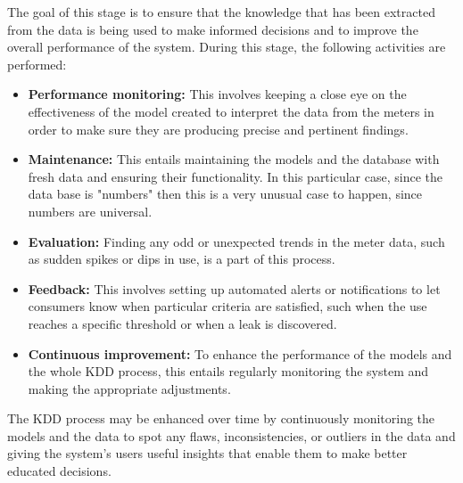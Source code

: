 The goal of this stage is to ensure that the knowledge that has been extracted from the data is being used to make informed decisions and to improve the overall performance of the system. During this stage, the following activities are performed:

\begin{itemize}
	\item \textbf{Performance monitoring:} This involves keeping a close eye on the effectiveness of the model created to interpret the data from the meters in order to make sure they are producing precise and pertinent findings.
	\item \textbf{Maintenance:} This entails maintaining the models and the database with fresh data and ensuring their functionality. In this particular case, since the data base is "numbers" then this is a very unusual case to happen, since numbers are universal.
	\item \textbf{Evaluation:} Finding any odd or unexpected trends in the meter data, such as sudden spikes or dips in use, is a part of this process.
	\item \textbf{Feedback:} This involves setting up automated alerts or notifications to let consumers know when particular criteria are satisfied, such when the use reaches a specific threshold or when a leak is discovered.
	\item \textbf{Continuous improvement:} To enhance the performance of the models and the whole KDD process, this entails regularly monitoring the system and making the appropriate adjustments.
\end{itemize}

The KDD process may be enhanced over time by continuously monitoring the models and the data to spot any flaws, inconsistencies, or outliers in the data and giving the system's users useful insights that enable them to make better educated decisions.

